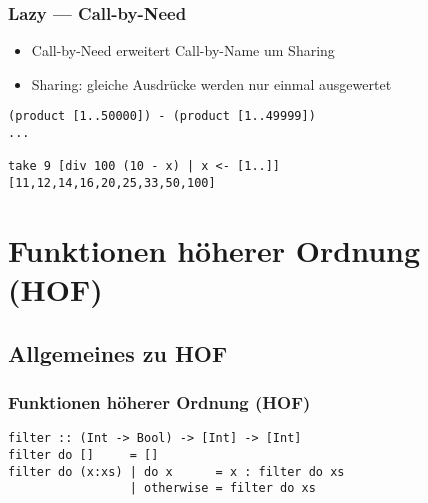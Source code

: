 \documentclass[fleqn,11pt,aspectratio=43]{beamer}
\begin{document}
\begin{frame}[fragile]
\frametitle{Lazy --- Call-by-Need}
\begin{block}{\vspace*{-3ex}}
\begin{itemize}
  \item Call-by-Need erweitert Call-by-Name um Sharing
  \item Sharing: gleiche Ausdrücke werden nur einmal ausgewertet
\end{itemize}
\end{block}
\begin{lstlisting}
(product [1..50000]) - (product [1..49999])
...

take 9 [div 100 (10 - x) | x <- [1..]]
[11,12,14,16,20,25,33,50,100]
\end{lstlisting}
\end{frame}

\section{Funktionen höherer Ordnung (HOF)}
\subsection{Allgemeines zu HOF}

\begin{frame}[fragile]
\frametitle{Funktionen höherer Ordnung (HOF)}
\begin{lstlisting}
filter :: (Int -> Bool) -> [Int] -> [Int]
filter do []     = []
filter do (x:xs) | do x      = x : filter do xs
                 | otherwise = filter do xs
\end{lstlisting}
\end{frame}
\end{document}
